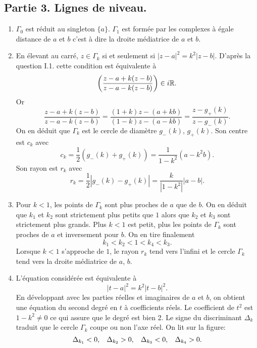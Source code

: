 \subsection*{Partie 3. Lignes de niveau.}
\begin{enumerate}
  \item $\Gamma_0$ est réduit au singleton $\{a\}$. $\Gamma_1$ est formée par les complexes à égale distance de $a$ et $b$ c'est à dire la droite médiatrice de $a$ et $b$.
  \item En élevant au carré, $z\in \Gamma_k$ si et seulement si $|z-a|^2 = k^2|z-b|$. D'après la question I.1. cette condition est équivalente à
\begin{displaymath}
  \left(\frac{z-a +k(z-b)}{z-a -k(z-b)} \right)\in i\mathbb{R} .
\end{displaymath}
Or
\begin{displaymath}
\frac{z-a +k(z-b)}{z-a -k(z-b)} = \frac{(1+k)z-(a+kb)}{(1-k)z-(a-kb)} 
= \frac{z-g_+(k)}{z-g_-(k)} .
\end{displaymath}
On en déduit que $\Gamma_k$ est le cercle de diamètre $g_-(k)$, $g_+(k)$.\newline
Son centre est $c_k$ avec
\begin{displaymath}
  c_k = \frac{1}{2}(g_-(k) + g_+(k))= \frac{1}{1-k^2}(a-k^2 b).
\end{displaymath}
Son rayon est $r_k$ avec
\begin{displaymath}
r_k = \frac{1}{2}|g_-(k) - g_+(k)| = \frac{k}{|1-k^2|}|a-b| .
\end{displaymath}

  \item Pour $k<1$, les points de $\Gamma_k$ sont plus proches de $a$ que de $b$. On en déduit que $k_1$ et $k_2$ sont strictement plus petits que $1$ alors que $k_2$ et $k_3$ sont strictement plus grands. Plus $k<1$ est petit, plus les points de $\Gamma_k$ sont proches de $a$ et inversement pour $b$. On en tire finalement
\begin{displaymath}
  k_1 < k_2 < 1 < k_4 < k_3 .
\end{displaymath}
Lorsque $k<1$ s'approche de $1$, le rayon $r_k$ tend vers l'infini et le cercle $\Gamma_k$ tend vers la droite médiatrice de $a$, $b$.

  \item L'équation considérée est équivalente à
\begin{displaymath}
  |t-a|^2 = k^2|t-b|^2 .
\end{displaymath}
En développant avec les parties réelles et imaginaires de $a$ et $b$, on obtient une équation du second degré en $t$ à coefficients réels. Le coefficient de $t^2$ est $1-k^2\neq0$ ce qui assure que le degré est bien 2.\newline
Le signe du discriminant $\Delta_k$ traduit que le cercle $\Gamma_k$ coupe ou non l'axe réel. On lit sur la figure:
\begin{displaymath}
  \Delta_{k_1}<0,\hspace{0.3cm}   \Delta_{k_2}>0,\hspace{0.3cm}   \Delta_{k_3}<0,\hspace{0.3cm}   \Delta_{k_4}>0 .
\end{displaymath}


\end{enumerate}
